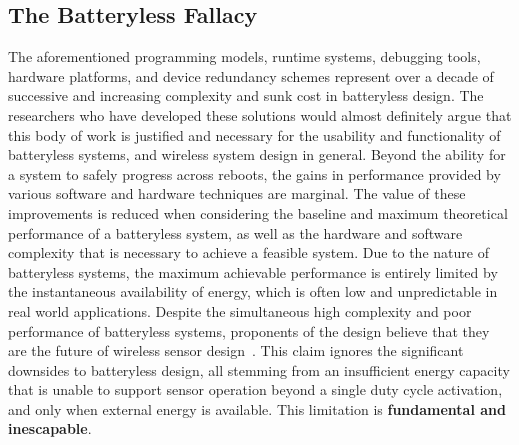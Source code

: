 \subsection{The Batteryless Fallacy}
The aforementioned programming models, runtime systems, debugging tools, hardware platforms, and device redundancy schemes represent over a decade of successive and increasing complexity and sunk cost in batteryless design.
The researchers who have developed these solutions would almost definitely argue that this body of work is justified and necessary for the usability and functionality of batteryless systems, and wireless system design in general.
Beyond the ability for a system to safely progress across reboots, the gains in performance provided by various software and hardware techniques are marginal.
The value of these improvements is reduced when considering the baseline and maximum theoretical performance of a batteryless system, as well as the hardware and software complexity that is necessary to achieve a feasible system.
Due to the nature of batteryless systems, the maximum achievable performance is entirely limited by the instantaneous availability of energy, which is often low and unpredictable in real world applications.
Despite the simultaneous high complexity and poor performance of batteryless systems, proponents of the design believe that they are the future of wireless sensor design~\cite{hester2017future}.
This claim ignores the significant downsides to batteryless design, all stemming from an insufficient energy capacity that is unable to support sensor operation beyond a single duty cycle activation, and only when external energy is available.
This limitation is \textbf{fundamental and inescapable}.%

